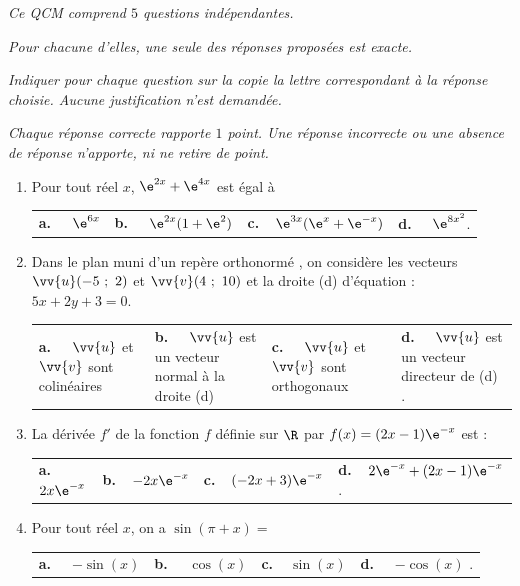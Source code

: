 \medskip

\emph{Ce QCM comprend $5$ questions indépendantes.}

\emph{Pour chacune d'elles, une seule des réponses proposées est exacte.}
 
\emph{Indiquer pour chaque question sur la copie la lettre correspondant à la réponse
choisie. Aucune justification n'est demandée.}

\emph{Chaque réponse correcte rapporte $1$ point. Une réponse incorrecte ou une absence de
réponse n'apporte, ni ne retire de point.}

\medskip

\begin{enumerate}
\item Pour tout réel $x$, $\e^{2x}+\e^{4x}$ est égal à

\begin{tabularx}{\linewidth}{*{4}{X}}
\textbf{a.~~} $\e^{6x}$ &\textbf{b.~~} $\e^{2x}(1+\e^{2})$&\textbf{c.~~}$\e^{3x}(\e^{x}+\e^{-x})$& \textbf{d.~~} $\e^{8x^2} $.
\end{tabularx}

\item Dans le plan muni d'un repère orthonormé \Oij, on considère les vecteurs $\vv{u}(-5~;~2)$ et \mbox {$\vv{v}(4~;~10)$} et la droite (d) d'équation : $5x + 2y + 3 = 0$.

\begin{tabularx}{\linewidth}{*{4}{X}}
\textbf{a.~~} $\vv{u}$ et $\vv{v}$  sont colinéaires &\textbf{b.~~} $\vv{u}$ est un vecteur normal à la droite (d) &\textbf{c.~~} $\vv{u}$ et $\vv{v}$  sont orthogonaux& \textbf{d.~~} $\vv{u}$ est un vecteur directeur de (d) .
\end{tabularx}

\item La dérivée $f'$ de la fonction $f$ définie sur $\R$ par $f(x)=(2x-1)\e^{-x}$  est : 

\begin{tabularx}{\linewidth}{*{4}{X}}
\textbf{a.~~}  $2x\e^{-x}$ &\textbf{b.~~}$-2x\e^{-x}$ &\textbf{c.~~}$(-2x+3)\e^{-x}$& \textbf{d.~~}$2\e^{-x}+(2x-1) \e^{-x}$  .
\end{tabularx}

\item Pour tout réel $x$, on a $\sin(\pi+x)=$

\begin{tabularx}{\linewidth}{*{4}{X}}
\textbf{a.~~} $-\sin (x)$ &\textbf{b.~~} $\cos (x)$&\textbf{c.~~}$\sin (x)$& \textbf{d.~~} $-\cos (x)$ .
\end{tabularx}
\smallskip


\end{enumerate}
